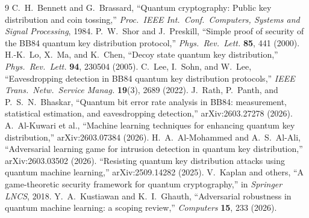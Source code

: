 \documentclass[11pt]{article}
\begin{document}
\begin{thebibliography}{9}
 C.\ H.\ Bennett and G.\ Brassard, ``Quantum cryptography: Public key
distribution and coin tossing,'' \emph{Proc.\ IEEE Int.\ Conf.\ Computers, Systems and
Signal Processing}, 1984.
 P.\ W.\ Shor and J.\ Preskill, ``Simple proof of security of the
BB84 quantum key distribution protocol,'' \emph{Phys.\ Rev.\ Lett.} \textbf{85}, 441
(2000).
 H.-K.\ Lo, X.\ Ma, and K.\ Chen, ``Decoy state quantum key
distribution,'' \emph{Phys.\ Rev.\ Lett.} \textbf{94}, 230504 (2005).
 C.\ Lee, I.\ Sohn, and W.\ Lee, ``Eavesdropping detection in BB84
quantum key distribution protocols,'' \emph{IEEE Trans.\ Netw.\ Service Manag.}
\textbf{19}(3), 2689 (2022).
 J.\ Rath, P.\ Panth, and P.\ S.\ N.\ Bhaskar, ``Quantum bit error
rate analysis in BB84: measurement, statistical estimation, and eavesdropping
detection,'' arXiv:2603.27278 (2026).
 A.\ Al-Kuwari et al., ``Machine learning techniques for enhancing
quantum key distribution,'' arXiv:2603.07384 (2026).
 H.\ A.\ Al-Mohammed and A.\ S.\ Al-Ali, ``Adversarial learning
game for intrusion detection in quantum key distribution,'' arXiv:2603.03502 (2026).
 ``Resisting quantum key distribution attacks using quantum machine
learning,'' arXiv:2509.14282 (2025).
 V.\ Kaplan and others, ``A game-theoretic security framework
for quantum cryptography,'' in \emph{Springer LNCS}, 2018.
 Y.\ A.\ Kustiawan and K.\ I.\ Ghauth, ``Adversarial robustness in
quantum machine learning: a scoping review,'' \emph{Computers} \textbf{15}, 233 (2026).
\end{thebibliography}
\end{document}
